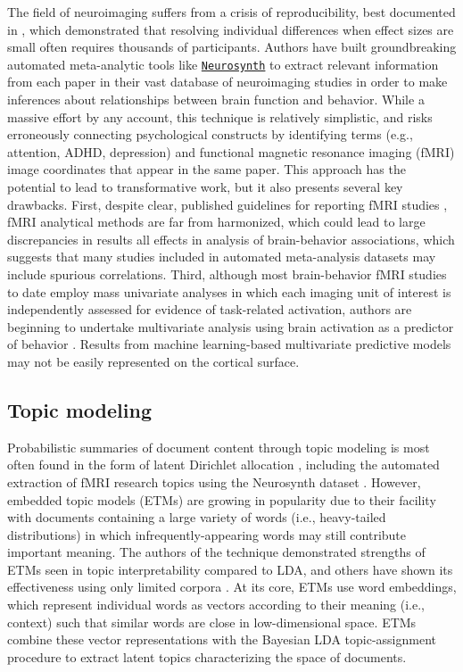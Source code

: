 The field of neuroimaging suffers from a crisis of reproducibility, best documented in \cite{MarekEtAl2022}, which demonstrated that resolving individual differences when effect sizes are small often requires thousands of participants. Authors have built groundbreaking automated meta-analytic tools like \href{https://neurosynth.org/}{\texttt{Neurosynth}} \cite{YarkoniEtAl2011} to extract relevant information from each paper in their vast database of neuroimaging studies in order to make inferences about relationships between brain function and behavior. While a massive effort by any account, this technique is relatively simplistic, and risks erroneously connecting psychological constructs by identifying terms (e.g., attention, ADHD, depression) and functional magnetic resonance imaging (fMRI) image coordinates that appear in the same paper. This approach has the potential to lead to transformative work, but it also presents several key drawbacks. First, despite clear, published guidelines for reporting fMRI studies \cite{PoldrackEtAl2008}, fMRI analytical methods are far from harmonized, which could lead to large discrepancies in results \cite{Botvinik-NezerEtAl2020} all effects in analysis of brain-behavior associations, which suggests that many studies included in automated meta-analysis datasets may include spurious correlations. Third, although most brain-behavior fMRI studies to date employ mass univariate analyses in which each imaging unit of interest is independently assessed for evidence of task-related activation, authors are beginning to undertake multivariate analysis using brain activation as a predictor of behavior \cite[e.g.,][]{YuanEtAl2023}. Results from machine learning-based multivariate predictive models may not be easily represented on the cortical surface. 	

\subsection{Topic modeling}

Probabilistic summaries of document content through topic modeling is most often found in the form of latent Dirichlet allocation \cite[LDA;][]{Blei2003}, including the automated extraction of fMRI research topics using the Neurosynth dataset \cite{PoldrackEtAl2012}. However, embedded topic models (ETMs) are growing in popularity due to their facility with documents containing a large variety of words (i.e., heavy-tailed distributions) in which infrequently-appearing words may still contribute important meaning. The authors of the technique demonstrated strengths of ETMs seen in topic interpretability compared to LDA, and others have shown its effectiveness using only limited corpora \cite{GulEtAl2023}. At its core, ETMs use word embeddings, which represent individual words as vectors according to their meaning (i.e., context) such that similar words are close in low-dimensional space. ETMs combine these vector representations with the Bayesian LDA topic-assignment procedure to extract latent topics characterizing the space of documents.


